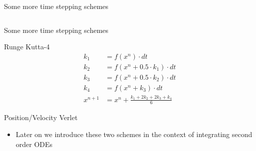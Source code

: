 \documentclass[presentation]{beamer}
\begin{document}
\begin{frame}[label={sec:org37c0d1d}]{Some more time stepping schemes}
\begin{columns}
\begin{column}{0.4\columnwidth}
\begin{center}
\end{center}
\end{column}
\end{columns}
\end{frame}
\begin{frame}[label={sec:org629e8fb}]{Some more time stepping schemes}
\begin{block}{Runge Kutta-4}
\begin{equation*}
\begin{aligned}
{k}_1 &= {f}({x}^{n}) \cdot dt \\
{k}_2 &= {f}({x}^{n} + 0.5 \cdot {k}_1)\cdot dt \\
{k}_3 &= {f}({x}^{n} + 0.5 \cdot {k}_2)\cdot dt \\
{k}_4 &= {f}({x}^{n} + {k}_3)\cdot dt \\
{x}^{n+1} &= {x}^{n} + \frac{{k}_1+2{k}_2+2{k}_3+{k}_4}{6}
\end{aligned}
\end{equation*}
\end{block}
\begin{block}{Position/Velocity Verlet}
\begin{itemize}
\item Later on we introduce these two schemes in the context of integrating
second order ODEs
\end{itemize}
\end{block}
\end{frame}
\end{document}
